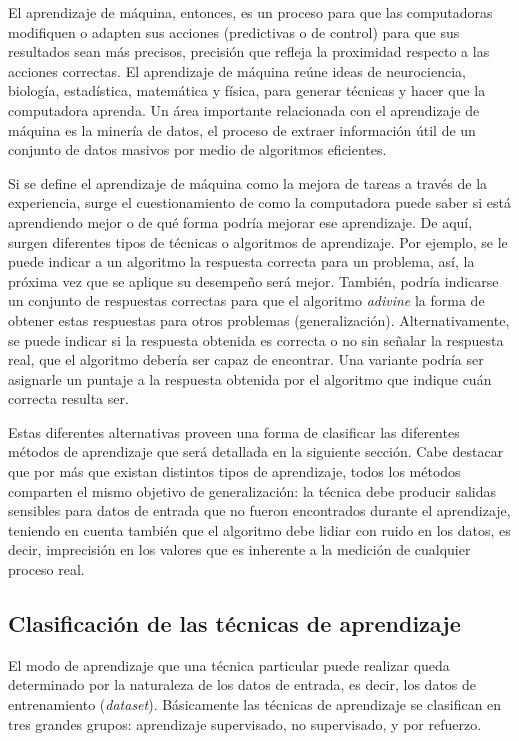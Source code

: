 El aprendizaje de máquina, entonces, es un proceso para que las computadoras
modifiquen o adapten sus acciones (predictivas o de control) para
que sus resultados sean más precisos, precisión que refleja la proximidad
respecto a las acciones correctas. El aprendizaje de máquina reúne
ideas de neurociencia, biología, estadística, matemática y física,
para generar técnicas y hacer que la computadora aprenda. Un área
importante relacionada con el aprendizaje de máquina es la minería
de datos, el proceso de extraer información útil de un conjunto de
datos masivos por medio de algoritmos eficientes. 

Si se define el aprendizaje de máquina como la mejora de tareas a
través de la experiencia, surge el cuestionamiento de como la computadora
puede saber si está aprendiendo mejor o de qué forma podría mejorar
ese aprendizaje. De aquí, surgen diferentes tipos de técnicas o algoritmos
de aprendizaje. Por ejemplo, se le puede indicar a un algoritmo la
respuesta correcta para un problema, así, la próxima vez que se aplique
su desempeño será mejor. También, podría indicarse un conjunto de
respuestas correctas para que el algoritmo \emph{adivine} la forma
de obtener estas respuestas para otros problemas (generalización).
Alternativamente, se puede indicar si la respuesta obtenida es correcta
o no sin señalar la respuesta real, que el algoritmo debería ser capaz
de encontrar. Una variante podría ser asignarle un puntaje a la respuesta
obtenida por el algoritmo que indique cuán correcta resulta ser. 

Estas diferentes alternativas proveen una forma de clasificar las
diferentes métodos de aprendizaje que será detallada en la siguiente
sección. Cabe destacar que por más que existan distintos tipos de
aprendizaje, todos los métodos comparten el mismo objetivo de generalización:
la técnica debe producir salidas sensibles para datos de entrada que
no fueron encontrados durante el aprendizaje, teniendo en cuenta también
que el algoritmo debe lidiar con ruido en los datos, es decir, imprecisión
en los valores que es inherente a la medición de cualquier proceso
real. 


\subsection{Clasificación de las técnicas de aprendizaje}



El modo de aprendizaje que una técnica particular puede realizar queda
determinado por la naturaleza de los datos de entrada, es decir, los
datos de entrenamiento (\emph{dataset}). Básicamente las técnicas
de aprendizaje se clasifican en tres grandes grupos: aprendizaje supervisado,
no supervisado, y por refuerzo.

